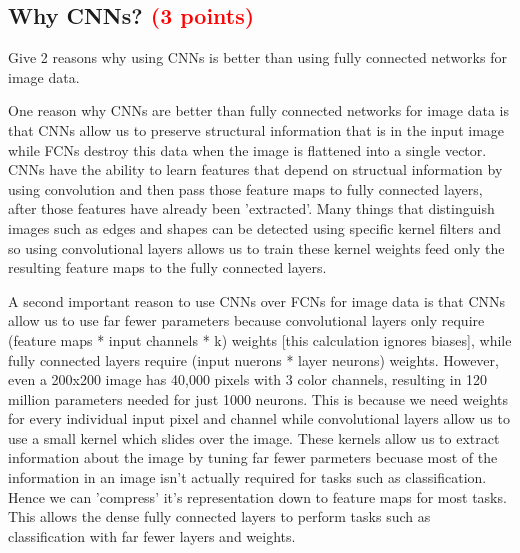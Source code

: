 \documentclass[answers]{exam}
\newcommand{\mypoints}[1]{\textcolor{red}{(#1 points)}}
\begin{document}
\subsection{Why CNNs? \mypoints{3}} 
Give 2 reasons why using CNNs is better than using fully connected networks for image data.
\begin{solution}
One reason why CNNs are better than fully connected networks for image data is that CNNs allow us to preserve structural information that is in the input image while FCNs destroy this data when the image
is flattened into a single vector. CNNs have the ability to learn features that depend on structual information by using convolution and then pass those feature maps to fully connected layers, after those features have already been 'extracted'. Many things that distinguish images such as edges and shapes can be detected using specific kernel filters and so using convolutional layers allows us to train these kernel weights feed only the resulting feature maps to the fully connected layers.

A second important reason to use CNNs over FCNs for image data is that CNNs allow us to use far fewer parameters because convolutional layers only require (feature maps * input channels * k) weights [this calculation ignores biases], while fully connected layers require (input nuerons * layer neurons) weights. However, even a 200x200 image has 40,000 pixels with 3 color channels, resulting in 120 million parameters needed for just 1000 neurons. This is because we need weights for every individual input pixel and channel while convolutional layers allow us to use a small kernel which slides over the image. These kernels allow us to extract information about the image by tuning far fewer parmeters becuase most of the information in an image isn't actually required for tasks such as classification. Hence we can 'compress' it's representation down to feature maps for most tasks. This allows the dense fully connected layers to perform tasks such as classification with far fewer layers and weights.
\end{solution}

% 
% 
\end{document}
